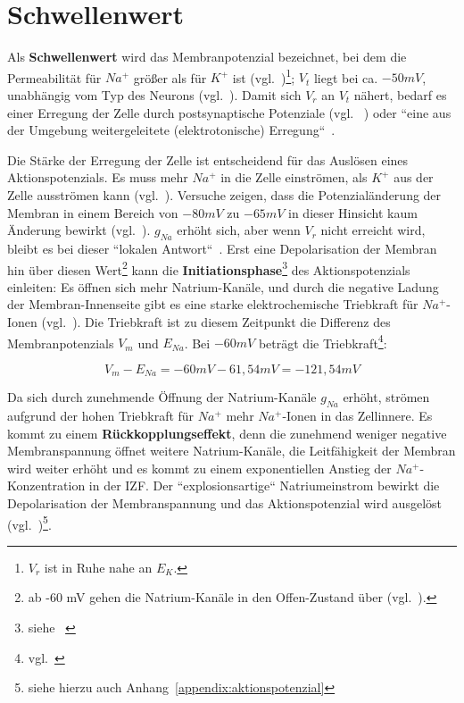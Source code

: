 {\section{Schwellenwert}\label{appendix:schwellenwert}
Als \textbf{Schwellenwert} wird das Membranpotenzial bezeichnet, bei dem die Permeabilität für $Na^+$ größer als für $K^+$ ist (vgl.~\cite[103]{BCP18})\footnote{$V_r$ ist in Ruhe nahe an $E_K$.}; $V_t$ liegt bei ca. $- 50mV$, unabhängig vom Typ des Neurons (vgl.~\cite[75]{Jon19}).
Damit sich $V_r$ an $V_t$ nähert, bedarf es einer Erregung der Zelle durch postsynaptische Potenziale (vgl. ~\cite[69]{FE19}) oder ``eine aus der Umgebung weitergeleitete (elektrotonische) Erregung``~\cite[46]{SD07}.

Die Stärke der Erregung der Zelle ist entscheidend für das Auslösen eines Aktionspotenzials. Es muss mehr $Na^+$ in die Zelle einströmen, als $K^+$ aus der Zelle ausströmen kann (vgl.~\cite[69]{FE19}).
Versuche zeigen, dass die Potenzialänderung der Membran in einem Bereich von $-80 mV$ zu $-65 mV$ in dieser Hinsicht kaum Änderung bewirkt (vgl.~\cite[99]{BCP18}). $g_{Na}$ erhöht sich, aber wenn $V_r$ nicht erreicht wird, bleibt es bei dieser ``lokalen Antwort``~\cite[46]{SD07}. Erst eine Depolarisation der Membran hin über diesen Wert\footnote{
    ab -60 mV gehen die Natrium-Kanäle in den Offen-Zustand über (vgl.~\cite[69]{FE19}).
} kann die \textbf{Initiationsphase}\footnote{siehe ~\cite[68]{FE19}} des Aktionspotenzials einleiten: Es öffnen sich mehr Natrium-Kanäle, und durch die negative Ladung der Membran-Innenseite gibt es eine starke elektrochemische Triebkraft für $Na^+$-Ionen (vgl.~\cite[103]{BCP18}). Die Triebkraft ist zu diesem Zeitpunkt die Differenz des Membranpotenzials $V_m$ und $E_{Na}$. Bei $-60 mV$ beträgt die Triebkraft\footnote{
    vgl.~\cite[39]{Fak19}
}:

\begin{equation}
    V_m - E_{Na} = -60 mV - 61,54 mV = -121,54 mV
    \label{eq:gl-triebkraft}
\end{equation}


Da sich durch zunehmende Öffnung der Natrium-Kanäle $g_{Na}$ erhöht, strömen aufgrund der hohen Triebkraft für $Na^+$ mehr $Na^+$-Ionen in das Zellinnere. Es kommt zu einem \textbf{Rückkopplungseffekt}, denn die zunehmend weniger negative Membranspannung öffnet weitere Natrium-Kanäle, die Leitfähigkeit der Membran wird weiter erhöht und es kommt zu einem exponentiellen Anstieg der $Na^+$-Konzentration in der IZF. Der ``explosionsartige`` Natriumeinstrom bewirkt die Depolarisation der Membranspannung und das Aktionspotenzial wird ausgelöst (vgl.~\cite[69]{FE19})\footnote{
    siehe hierzu auch Anhang~\ref{appendix:aktionspotenzial}
}.

}
